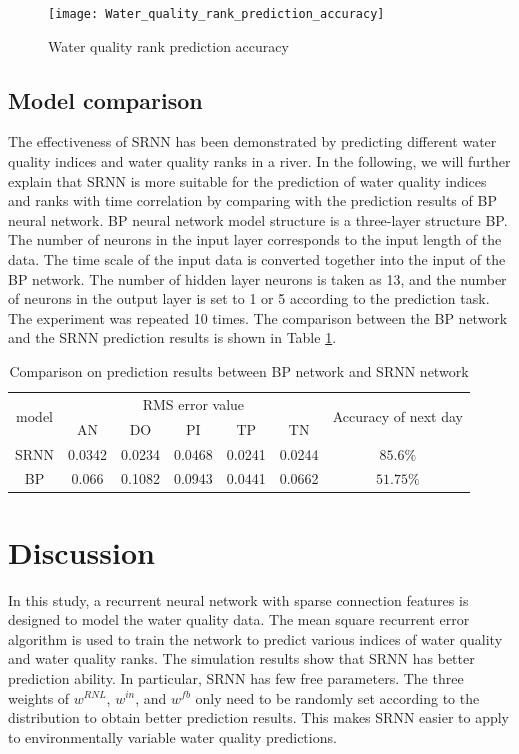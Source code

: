 \documentclass[runningheads]{llncs}
\begin{document}
\begin{figure}[htbp]
\centering
\texttt{[image: Water\_quality\_rank\_prediction\_accuracy]}
\caption{Water quality rank prediction accuracy}
\label{Water quality rank prediction accuracy}
\end{figure}

\subsection{Model comparison}
The effectiveness of SRNN has been demonstrated by predicting 
different water quality indices and water quality ranks in a river. 
In the following, we will further explain that SRNN is more suitable 
for the prediction of water quality indices and ranks with time 
correlation by comparing with the prediction results of BP neural network. 
BP neural network model structure is a three-layer structure BP. The number 
of neurons in the input layer corresponds to the input length of the data. 
The time scale of the input data is converted together into the input of 
the BP network. The number of hidden layer neurons is taken as 13, 
and the number of neurons in the output layer is set to 1 or 5 according 
to the prediction task. The experiment was repeated 10 times. 
The comparison between the BP network and the SRNN prediction results is shown in Table 
\ref{Comparison on prediction results between BP network and SRNN network}.

\begin{table}[htbp] 
\centering
\caption{Comparison on prediction results between BP network and SRNN network}
\label{Comparison on prediction results between BP network and SRNN network}
\begin{tabular}{ccccccc} 
\toprule 
\multirow{2}{*}{model}&\multicolumn{5}{c}{RMS error value}&\multirow{2}{4.25cm}{Accuracy of next day}\\
\cline{2-6}
&AN &DO&PI&TP&TN&\\
\midrule 
SRNN&0.0342&0.0234&0.0468&0.0241&0.0244&$85.6\%$\\
BP&0.066&0.1082&0.0943&0.0441&0.0662&$51.75\%$\\
\bottomrule 
\end{tabular} 
\end{table}

\section{Discussion}
In this study, a recurrent neural network with sparse connection features is 
designed to model the water quality data. The mean square recurrent error algorithm 
is used to train the network to predict various indices of water quality 
and water quality ranks. The simulation results show that SRNN has better 
prediction ability. In particular, SRNN has few free parameters. The three 
weights of $w^{RNL}$, $w^{in}$, and $w^{fb}$ only need to be randomly set 
according to the distribution to obtain better prediction results.
This makes SRNN easier to apply to environmentally variable water 
quality predictions.
\end{document}
